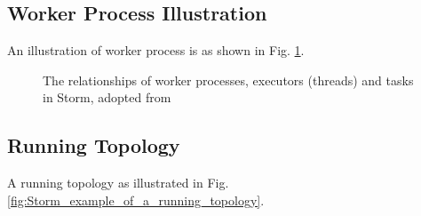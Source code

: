 \documentclass[9pt,twocolumn,twoside]{styles/osajnl}
\begin{document}
\subsection{Worker Process Illustration}
An illustration of worker process is as shown in
Fig. \ref{fig:Storm_worker-processes_executors_tasks}.

\begin{figure}[htbp]
	\centering
	\caption{The relationships of worker processes, executors
          (threads) and tasks in Storm, adopted from
          \cite{www-noll2012-parallelismofstormtopology} }
	\label{fig:Storm_worker-processes_executors_tasks}
\end{figure}


\subsection{Running Topology}
A running topology as illustrated in
Fig. \ref{fig:Storm_example_of_a_running_topology}.
\end{document}
